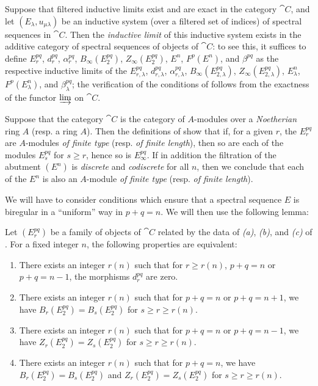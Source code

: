 \begin{env}[11.1.7]
\label{0.11.1.7}
Suppose that filtered inductive limits exist and are exact in the category $\cat{C}$, and let $(E_\lambda,u_{\mu\lambda})$ be an inductive system (over a filtered set of indices) of spectral sequences in $\cat{C}$.
Then the \emph{inductive limit} of this inductive system exists in the additive category of spectral sequences of objects of $\cat{C}$: to see this, it suffices to define $E_r^{pq}$, $d_r^{pq}$, $\alpha_r^{pq}$, $B_\infty(E_2^{pq})$, $Z_\infty(E_2^{pq})$, $E^n$, $F^p(E^n)$, and $\beta^{pq}$ as the respective inductive limits of the $E_{r,\lambda}^{pq}$, $d_{r,\lambda}^{pq}$, $\alpha_{r,\lambda}^{pq}$, $B_\infty(E_{2,\lambda}^{pq})$, $Z_\infty(E_{2,\lambda}^{pq})$, $E_\lambda^n$, $F^p(E_\lambda^n)$, and $\beta_\lambda^{pq}$; the verification of the conditions of  follows from the exactness of the functor $\varinjlim$ on $\cat{C}$.
\end{env}

\begin{remark}[11.1.8]
\label{0.11.1.8}
Suppose that the category $\cat{C}$ is the category of $A$-modules over a \emph{Noetherian} ring $A$ (resp. a ring $A$).
Then the definitions of  show that if, for a given $r$, the $E_r^{pq}$ are $A$-modules \emph{of finite type} (resp. \emph{of finite length}), then so are each of the modules $E_s^{pq}$ for $s\geq r$, hence so is $E_\infty^{pq}$.
If in addition the filtration of the abutment $(E^n)$ is \emph{discrete} and \emph{codiscrete} for all $n$, then we conclude that each of the $E^n$ is also an $A$-module \emph{of finite type} (resp. \emph{of finite length}).
\end{remark}

\begin{env}[11.1.9]
\label{0.11.1.9}
We will have to consider conditions which ensure that a spectral sequence $E$ is biregular in a ``uniform'' way in $p+q=n$.
We will then use the following lemma:
\end{env}

\begin{lemma}[11.1.10]
\label{0.11.1.10}
Let $(E_r^{pq})$ be a family of objects of $\cat{C}$ related by the data of \emph{(a)}, \emph{(b)}, and \emph{(c)} of .
For a fixed integer $n$, the following properties are equivalent:
\begin{enumerate}
  \item[{\rm(a)}] There exists an integer $r(n)$ such that for $r\geq r(n)$, $p+q=n$ or $p+q=n-1$, the morphisms $d_r^{pq}$ are zero.
  \item[{\rm(b)}] There exists an integer $r(n)$ such that for $p+q=n$ or $p+q=n+1$, we have $B_r(E_2^{pq})=B_s(E_2^{pq})$ for $s\geq r\geq r(n)$.
  \item[{\rm(c)}] There exists an integer $r(n)$ such that for $p+q=n$ or $p+q=n-1$, we have $Z_r(E_2^{pq})=Z_s(E_2^{pq})$ for $s\geq r\geq r(n)$.
  \item[{\rm(d)}] There exists an integer $r(n)$ such that for $p+q=n$, we have $B_r(E_2^{pq})=B_s(E_2^{pq})$ and $Z_r(E_2^{pq})=Z_s(E_2^{pq})$ for $s\geq r\geq r(n)$.
\end{enumerate}
\end{lemma}

